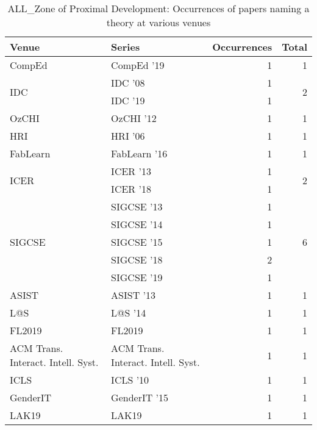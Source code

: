 \begin{table*}[t]
\begin{tabular}{llrr}
Venue & Series & Occurrences & Total\\\hline
\multirow{1}{*}{CompEd } & CompEd '19 & 1 & \multirow{1}{*}{1}\\
\multirow{2}{*}{IDC } & IDC '08 & 1 & \multirow{2}{*}{2}\\
& IDC '19 & 1 &\\
\multirow{1}{*}{OzCHI } & OzCHI '12 & 1 & \multirow{1}{*}{1}\\
\multirow{1}{*}{HRI } & HRI '06 & 1 & \multirow{1}{*}{1}\\
\multirow{1}{*}{FabLearn } & FabLearn '16 & 1 & \multirow{1}{*}{1}\\
\multirow{2}{*}{ICER } & ICER '13 & 1 & \multirow{2}{*}{2}\\
& ICER '18 & 1 &\\
\multirow{5}{*}{SIGCSE } & SIGCSE '13 & 1 & \multirow{5}{*}{6}\\
& SIGCSE '14 & 1 &\\
& SIGCSE '15 & 1 &\\
& SIGCSE '18 & 2 &\\
& SIGCSE '19 & 1 &\\
\multirow{1}{*}{ASIST } & ASIST '13 & 1 & \multirow{1}{*}{1}\\
\multirow{1}{*}{L@S } & L@S '14 & 1 & \multirow{1}{*}{1}\\
\multirow{1}{*}{FL2019} & FL2019 & 1 & \multirow{1}{*}{1}\\
\multirow{1}{*}{ACM Trans. Interact. Intell. Syst.} & ACM Trans. Interact. Intell. Syst. & 1 & \multirow{1}{*}{1}\\
\multirow{1}{*}{ICLS } & ICLS '10 & 1 & \multirow{1}{*}{1}\\
\multirow{1}{*}{GenderIT } & GenderIT '15 & 1 & \multirow{1}{*}{1}\\
\multirow{1}{*}{LAK19} & LAK19 & 1 & \multirow{1}{*}{1}\\
\end{tabular}
\caption{ALL\_Zone of Proximal Development: Occurrences of papers naming a theory at various venues}
\end{table*}